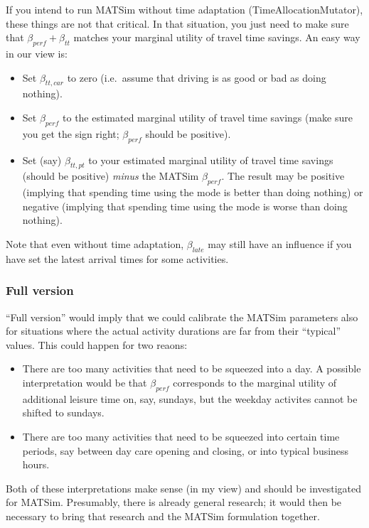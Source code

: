 If you intend to run MATSim without time adaptation  (TimeAllocationMutator), these things are not that critical. In  that situation, you just need to make sure that $\beta_{perf} + \beta_{tt}$  matches your marginal utility of travel time savings. An easy  way in our view is:
\begin{itemize}

\item Set $\beta_{tt,car}$ to zero (i.e.\ assume that driving
	is as good or bad as doing nothing).  

\item Set $\beta_{perf}$ to
	the estimated marginal utility of travel time savings (make
	sure you get the sign right; $\beta_{perf}$ should be
	positive).  \item Set (say) $\beta_{tt,pt}$ to your estimated
	marginal utility of travel time savings (should be
	positive) \emph{minus} the MATSim $\beta_{perf}$. The result may
	be positive (implying that spending time using the mode is
	better than doing nothing) or negative (implying that spending
	time using the mode is worse than doing nothing).
\end{itemize}
Note that even without time adaptation, $\beta_{late}$ may still have an influence if you have set the latest arrival times for some  activities.

\subsubsection{Full version}

``Full version'' would imply that we could calibrate the MATSim  parameters also for situations where the actual activity durations are  far from their ``typical'' values. This could happen for two reaons:
\begin{itemize}

\item There are too many activities that need to be squeezed into a  day. A possible interpretation would be that $\beta_{perf}$ corresponds  to the marginal utility of additional leisure time on, say, sundays,  but the weekday activites cannot be shifted to sundays.

\item There are too many activities that need to be squeezed
into certain time periods, say between day care opening and closing,
or into typical business hours.

\end{itemize}
Both of these interpretations make sense (in my view) and should be
investigated for MATSim. Presumably, there is already general
research; it would then be necessary to bring that research and the
MATSim formulation together.


